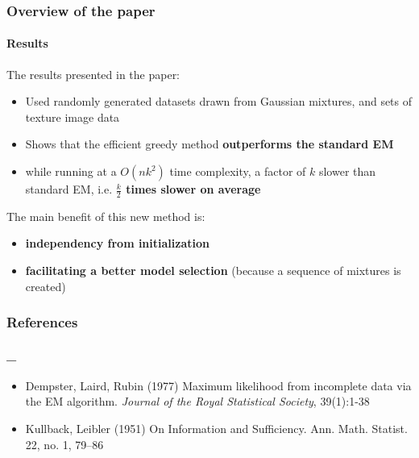 \documentclass[aspectratio=43]{beamer}
\begin{document}
\begin{frame}
    \frametitle{Overview of the paper}
    \framesubtitle{Results}
    The results presented in the paper:
    \begin{itemize}
      \item Used randomly generated datasets drawn from Gaussian mixtures, and sets of texture image data
      \item Shows that the efficient greedy method \textbf{outperforms the standard EM}
      \item while running at a $O(nk^2)$ time complexity, a factor of $k$ slower than standard EM, i.e. \textbf{$\frac{k}{2}$ times slower on average}\newline
    \end{itemize}
    The main benefit of this new method is:
    \begin{itemize}
      \item \textbf{independency from initialization}
      \item \textbf{facilitating a better model selection} (because a sequence of mixtures is created)
    \end{itemize}
\end{frame}

\begin{frame}
    \frametitle{References}
    \framesubtitle{_}
    \begin{itemize}
      \item Dempster, Laird, Rubin (1977) Maximum likelihood from incomplete data via the EM algorithm. \textit{Journal of the Royal Statistical Society}, 39(1):1-38
      \item Kullback, Leibler (1951) On Information and Sufficiency. Ann. Math. Statist. 22, no. 1, 79--86
    \end{itemize}
\end{frame}
\end{document}
